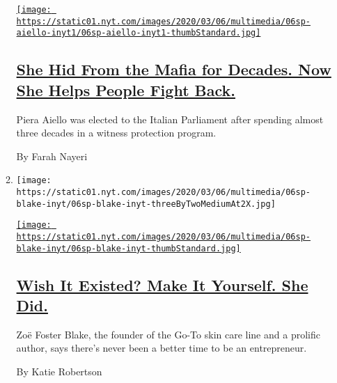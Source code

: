 \begin{enumerate}
\begin{enumerate}
    \href{/2020/03/05/world/europe/piera-aiello-mafia-italian-parliament.html}{\texttt{[image: https://static01.nyt.com/images/2020/03/06/multimedia/06sp-aiello-inyt1/06sp-aiello-inyt1-thumbStandard.jpg]}}

    \hypertarget{she-hid-from-the-mafia-for-decades-now-she-helps-people-fight-back}{%
    \subsection{\texorpdfstring{\href{/2020/03/05/world/europe/piera-aiello-mafia-italian-parliament.html}{She
    Hid From the Mafia for Decades. Now She Helps People Fight
    Back.}}{She Hid From the Mafia for Decades. Now She Helps People Fight Back.}}\label{she-hid-from-the-mafia-for-decades-now-she-helps-people-fight-back}}

    Piera Aiello was elected to the Italian Parliament after spending
    almost three decades in a witness protection program.

    By Farah Nayeri
  \item
    \texttt{[image: https://static01.nyt.com/images/2020/03/06/multimedia/06sp-blake-inyt/06sp-blake-inyt-threeByTwoMediumAt2X.jpg]}

    \href{/2020/03/05/business/zoe-foster-blake-go-to-skin-care.html}{\texttt{[image: https://static01.nyt.com/images/2020/03/06/multimedia/06sp-blake-inyt/06sp-blake-inyt-thumbStandard.jpg]}}

    \hypertarget{wish-it-existed-make-it-yourself-she-did}{%
    \subsection{\texorpdfstring{\href{/2020/03/05/business/zoe-foster-blake-go-to-skin-care.html}{Wish
    It Existed? Make It Yourself. She
    Did.}}{Wish It Existed? Make It Yourself. She Did.}}\label{wish-it-existed-make-it-yourself-she-did}}

    Zoë Foster Blake, the founder of the Go-To skin care line and a
    prolific author, says there's never been a better time to be an
    entrepreneur.

    By Katie Robertson
  \end{enumerate}
\end{enumerate}

